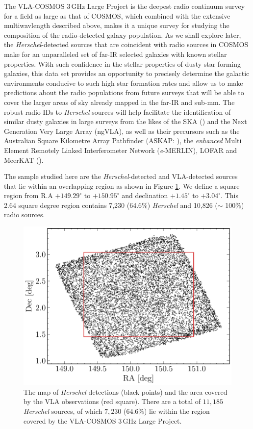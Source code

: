 The VLA-COSMOS 3\,GHz Large Project is the deepest radio continuum survey for a field as large as that of COSMOS, which combined with the extensive multiwavlength described above, makes it a unique survey for studying the composition of the radio-detected galaxy population. As we shall explore later, the \textit{Herschel}-detected sources that are coincident with radio sources in COSMOS make for an unparalleled set of far-IR selected galaxies with known stellar properties. With such confidence in the stellar properties of dusty star forming galaxies, this data set provides an opportunity to precisely determine the galactic environments conducive to such high star formation rates and allow us to make predictions about the radio populations from future surveys that will be able to cover the larger areas of sky already mapped in the far-IR and sub-mm. The robust radio IDs to \textit{Herschel} sources will help facilitate the identification of similar dusty galaxies in large surveys from the likes of the SKA (\citealt{Dewdney_2009}) and the Next Generation Very Large Array (ngVLA), as well as their precursors such as the Australian Square Kilometre Array Pathfinder (ASKAP: \citealt{Johnston_2007}), the \textit{enhanced} Multi Element Remotely Linked Interferometer Network (\textit{e}-MERLIN), LOFAR and MeerKAT (\citealt{Jonas_2009}).

The sample studied here are the \textit{Herschel}-detected and VLA-detected sources that lie within an overlapping region as shown in Figure \ref{fig:sky_map}. We define a square region from R.A $+149.29^{\circ}$ to $+150.95^{\circ}$ and declination $+1.45^{\circ}$ to $+3.04^{\circ}$. This 2.64 square degree region contains 7,230 (64.6\%) \textit{Herschel} and 10,826 ($\sim$ 100\%) radio sources.

\begin{figure}
	\centering
	\includegraphics[width=0.75\columnwidth]{Figures/sky_map.pdf}
	\caption{The map of \textit{Herschel} detections (black points) and the area covered by the VLA observations (red square). There are a total of $11,185$ \textit{Herschel} sources, of which $7,230$ ($64.6$\%) lie within the region covered by the VLA-COSMOS $3\,$GHz Large Project.}
	\label{fig:sky_map}
\end{figure}

